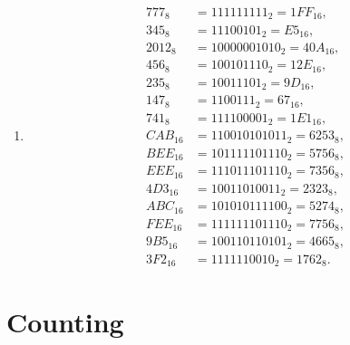 \begin{enumerate}
\begin{enumerate}
\item
\begin{align*}
777_8 &= 111111111_2 = 1FF_{16}, \\
345_8 &= 11100101_2 = E5_{16}, \\
2012_8 &= 10000001010_2 = 40A_{16}, \\
456_8 &= 100101110_2 = 12E_{16}, \\
235_8 &= 10011101_2 = 9D_{16}, \\
147_8 &= 1100111_2 = 67_{16}, \\
741_8 &= 111100001_2 = 1E1_{16}, \\ 
CAB_{16} &= 110010101011_2 = 6253_8, \\
BEE_{16} &= 101111101110_2 = 5756_8, \\
EEE_{16} &= 111011101110_2 = 7356_8, \\
4D3_{16} &= 10011010011_2 = 2323_8, \\
ABC_{16} &= 101010111100_2 = 5274_8, \\
FEE_{16} &= 111111101110_2 = 7756_8, \\
9B5_{16} &= 100110110101_2 = 4665_8, \\
3F2_{16} &= 1111110010_2 = 1762_8. 
\end{align*}

\end{enumerate}


\end{enumerate}
\newpage
\section{Counting}

